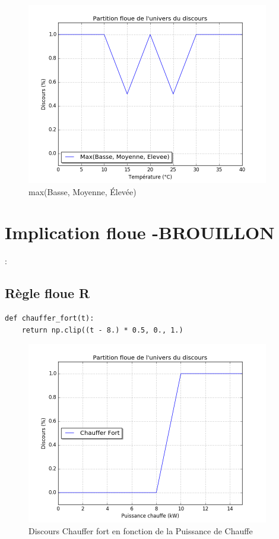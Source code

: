 \documentclass[a4paper]{article}
\begin{document}
\begin{figure}[h]
\begin{center}
	\includegraphics[width=400px]{plot_test_max.png}
\end{center}
\caption{max(Basse, Moyenne, Élevée)}
\end{figure}


\clearpage

\section{Implication floue -BROUILLON}:

\subsection{Règle floue R}
\begin{lstlisting}
def chauffer_fort(t):
    return np.clip((t - 8.) * 0.5, 0., 1.)
\end{lstlisting}

\begin{figure}[h]
\begin{center}
	\includegraphics[width=400px]{chauffer_fort.png}
\end{center}
\caption{Discours Chauffer fort en fonction de la Puissance de Chauffe}
\end{figure}
\end{document}
